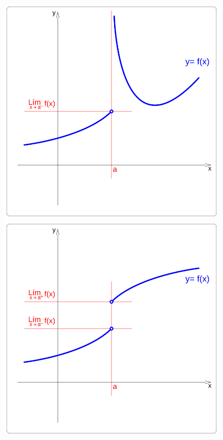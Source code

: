\begin{figure}[hbp]
\includegraphics[scale=0.195]{img/Funs/funcion_xy_discontin_6ueR5}
\includegraphics[scale=0.195]{img/Funs/funcion_xy_discontin_U72G2}

\end{figure}

